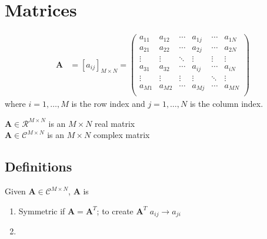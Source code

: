 \documentclass[12pt]{article}
\newcommand{\ve}[1]{\ensuremath{\mathbf{#1}}}
\begin{document}
\section{Matrices}

\begin{align}
    \ve{A} &= [a_{ij}]_{M\times N}   =    \begin{pmatrix}
      a_{11} & a_{12} & \cdots & a_{1j} & \cdots & a_{1N} \\
      a_{21} & a_{22} & \cdots & a_{2j} & \cdots & a_{2N} \\
       \vdots & \vdots & \ddots & \vdots & \vdots   & \vdots \\     
      a_{31} & a_{32} & \cdots & a_{ij} & \cdots & a_{iN} \\
      \vdots & \vdots & \vdots & \vdots & \ddots   & \vdots \\
      a_{M1} & a_{M2} & \cdots & a_{Mj} & \cdots & a_{MN} \\
    \end{pmatrix} \nonumber   
\end{align} 
%
where $i = 1, \dots, M$ is the row index and $j = 1, \dots, N$ is the column index.

$\ve{A} \in \mathcal{R}^{M \times N}$ is an $M \times N$ real matrix\\
$\ve{A} \in \mathcal{C}^{M \times N}$ is an $M \times N$ complex matrix

\subsection{Definitions}

Given $\ve{A} \in \mathcal{C}^{M \times N}$, \ve{A} is
%
\begin{enumerate}
\item Symmetric if $\ve{A} = \ve{A}^T$; to create $\ve{A}^T$ $a_{ij} \rightarrow a_{ji}$
\item 
\end{enumerate}
\end{document}
